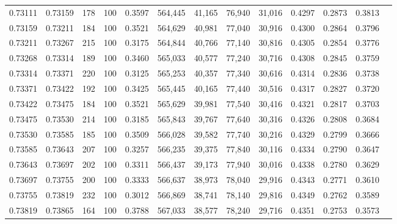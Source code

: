 \begin{tabular}{rrrrrrrrrrrrr}
0.73111 & 0.73159 &   178 & 100 &                                     0.3597 & 564,445 &  41,165 &  76,940 &  31,016 & 0.4297 & 0.2873 & 0.3813 \\
0.73159 & 0.73211 &   184 & 100 &                                     0.3521 & 564,629 &  40,981 &  77,040 &  30,916 & 0.4300 & 0.2864 & 0.3796 \\
0.73211 & 0.73267 &   215 & 100 &                                     0.3175 & 564,844 &  40,766 &  77,140 &  30,816 & 0.4305 & 0.2854 & 0.3776 \\
0.73268 & 0.73314 &   189 & 100 &                                     0.3460 & 565,033 &  40,577 &  77,240 &  30,716 & 0.4308 & 0.2845 & 0.3759 \\
0.73314 & 0.73371 &   220 & 100 &                                     0.3125 & 565,253 &  40,357 &  77,340 &  30,616 & 0.4314 & 0.2836 & 0.3738 \\
0.73371 & 0.73422 &   192 & 100 &                                     0.3425 & 565,445 &  40,165 &  77,440 &  30,516 & 0.4317 & 0.2827 & 0.3720 \\
0.73422 & 0.73475 &   184 & 100 &                                     0.3521 & 565,629 &  39,981 &  77,540 &  30,416 & 0.4321 & 0.2817 & 0.3703 \\
0.73475 & 0.73530 &   214 & 100 &                                     0.3185 & 565,843 &  39,767 &  77,640 &  30,316 & 0.4326 & 0.2808 & 0.3684 \\
0.73530 & 0.73585 &   185 & 100 &                                     0.3509 & 566,028 &  39,582 &  77,740 &  30,216 & 0.4329 & 0.2799 & 0.3666 \\
0.73585 & 0.73643 &   207 & 100 &                                     0.3257 & 566,235 &  39,375 &  77,840 &  30,116 & 0.4334 & 0.2790 & 0.3647 \\
0.73643 & 0.73697 &   202 & 100 &                                     0.3311 & 566,437 &  39,173 &  77,940 &  30,016 & 0.4338 & 0.2780 & 0.3629 \\
0.73697 & 0.73755 &   200 & 100 &                                     0.3333 & 566,637 &  38,973 &  78,040 &  29,916 & 0.4343 & 0.2771 & 0.3610 \\
0.73755 & 0.73819 &   232 & 100 &                                     0.3012 & 566,869 &  38,741 &  78,140 &  29,816 & 0.4349 & 0.2762 & 0.3589 \\
0.73819 & 0.73865 &   164 & 100 &                                     0.3788 & 567,033 &  38,577 &  78,240 &  29,716 & 0.4351 & 0.2753 & 0.3573 \\

\end{tabular}
